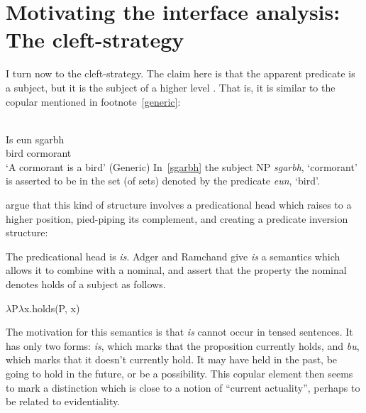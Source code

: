 \documentclass[output=paper]{langsci/langscibook}
\begin{document}
\section{Motivating the interface analysis: The cleft-strategy}\label{motiv2}

I turn now to the cleft-strategy. The claim here is that the apparent predicate
is a subject, but it is the subject of a higher level . That is, it
is similar to the copular  mentioned in footnote~\ref{generic}:

\ea {} \label{sgarbh}\\
\gll   Is eun sgarbh\\
\Cop{} bird cormorant\\
\glt \enquote*{A cormorant is a bird} (Generic)
\z
In~\eqref{sgarbh} the subject NP \emph{sgarbh}, `cormorant' is asserted to be in
the set (of sets) denoted by the predicate \emph{eun}, `bird'.

\citet{adger-ramchand:03} argue that this kind of structure involves a
predicational head which raises to a higher position, pied-piping its
complement, and creating a predicate inversion structure:

\ea \label{copularinversion}
\z

The predicational head is \emph{is}. Adger and Ramchand give \emph{is} a semantics which allows it to combine with a nominal, and assert that the property the nominal denotes holds of a subject as follows.

\ea $\lambda$P$\lambda$x.holds(P, x) \z

The motivation for this semantics is that \emph{is} cannot occur in tensed sentences. It has only two forms: \emph{is}, which marks that the proposition currently holds, and \emph{bu}, which marks that it doesn't currently hold. It may have held in the past, be going to hold in the future, or be a possibility. This copular element then seems to mark a distinction which
is close to a notion of ``current actuality'', perhaps to be related to evidentiality.
\end{document}
